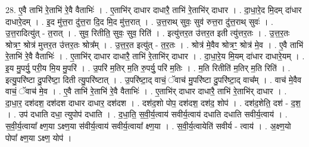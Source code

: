 \documentclass[17pt]{extarticle}
\begin{document}
28. ए॒वै ताभि॑ रे॒ताभि॑ रे॒वै वैताभिः॑ । . ए॒ताभि॑र् दाधार दाधारै॒ ताभि॑ रे॒ताभि॑र् दाधार । . दा॒धा॒रे॒द मि॒दम् दा॑धार दाधारे॒दम् । . इ॒द मु॑त्त॒रा दु॑त्त॒रा दि॒द मि॒द मु॑त्त॒रात् । . उ॒त्त॒राथ् सुवः॒ सुव॑ रुत्त॒रा दु॑त्त॒राथ् सुवः॑ । . उ॒त्त॒रादित्यु॑त् - त॒रात् । . सुव॒ रितीति॒ सुवः॒ सुव॒ रिति॑ । . इत्यु॑त्तर॒त उ॑त्तर॒त इती त्यु॑त्तर॒तः । . उ॒त्त॒र॒तः श्रोत्रꣳ॒॒ श्रोत्र॑ मुत्तर॒त उ॑त्तर॒तः श्रोत्र᳚म् । . उ॒त्त॒र॒त इत्यु॑त् - त॒र॒तः । . श्रोत्र॑ मे॒वैव श्रोत्रꣳ॒॒ श्रोत्र॑ मे॒व । . ए॒वै ताभि॑ रे॒ताभि॑ रे॒वै वैताभिः॑ । . ए॒ताभि॑र् दाधार दाधारै॒ ताभि॑ रे॒ताभि॑र् दाधार । . दा॒धा॒रे॒य मि॒यम् दा॑धार दाधारे॒यम् । . इ॒य मु॒पर्यु॒ परी॒य मि॒य मु॒परि॑ । . उ॒परि॑ म॒तिर् म॒ति रु॒पर्यु॒ परि॑ म॒तिः । . म॒ति रितीति॑ म॒तिर् म॒ति रिति॑ । . इत्यु॒परि॑ष्टा दु॒परि॑ष्टा॒ दिती त्यु॒परि॑ष्टात् । . उ॒परि॑ष्टा॒द् वाचं॒ ॅवाच॑ मु॒परि॑ष्टा दु॒परि॑ष्टा॒द् वाच᳚म् । . वाच॑ मे॒वैव वाचं॒ ॅवाच॑ मे॒व । . ए॒वै ताभि॑ रे॒ताभि॑ रे॒वै वैताभिः॑ । . ए॒ताभि॑र् दाधार दाधारै॒ ताभि॑ रे॒ताभि॑र् दाधार । . दा॒धा॒र॒ दश॑दश॒ दश॑दश दाधार दाधार॒ दश॑दश । . दश॑द॒शो पोप॒ दश॑दश॒ दश॑द॒ शोप॑ । . दश॑द॒शेति॒ दश॑ - द॒श॒ । . उप॑ दधाति दधा॒ त्युपोप॑ दधाति । . द॒धा॒ति॒ स॒वी॒र्य॒त्वाय॑ सवीर्य॒त्वाय॑ दधाति दधाति सवीर्य॒त्वाय॑ । . स॒वी॒र्य॒त्वाया᳚ क्ष्ण॒या ऽक्ष्ण॒या स॑वीर्य॒त्वाय॑ सवीर्य॒त्वाया᳚ क्ष्ण॒या । . स॒वी॒र्य॒त्वायेति॑ सवीर्य - त्वाय॑ । . अ॒क्ष्ण॒यो पोपा᳚ क्ष्ण॒या ऽक्ष्ण॒ योप॑ । \newline
\end{document}
